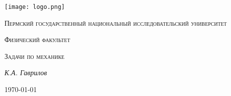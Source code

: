 \begin{titlepage}
	\centering
	\texttt{[image: logo.png]}\par\vspace{1cm}
	{\scshape Пермский государственный национальный исследовательский университет\par}
	\vspace{0.5cm}
	{\scshape Физический факультет \par}
	\vspace{1cm}
	{\scshape\LARGE Задачи по механике\par}
	\vspace{2cm}
	{\Large\itshape К.А. Гаврилов\par}
	\vfill
	{\large \today\par}
\end{titlepage}